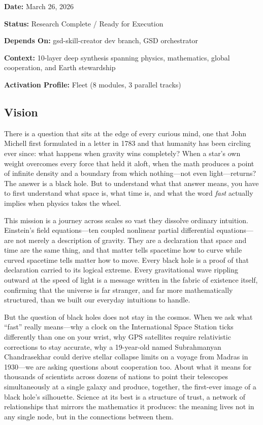 \documentclass[11pt,letterpaper]{article}
\newcommand{\metafield}[2]{\textbf{\sffamily #1} #2\par}
\begin{document}
\metafield{Date:}{March 26, 2026}
\metafield{Status:}{Research Complete / Ready for Execution}
\metafield{Depends On:}{gsd-skill-creator dev branch, GSD orchestrator}
\metafield{Context:}{10-layer deep synthesis spanning physics, mathematics, global cooperation, and Earth stewardship}
\metafield{Activation Profile:}{Fleet (8 modules, 3 parallel tracks)}

\subsection{Vision}

There is a question that sits at the edge of every curious mind, one that John Michell first formulated in a letter in 1783 and that humanity has been circling ever since: what happens when gravity wins completely? When a star's own weight overcomes every force that held it aloft, when the math produces a point of infinite density and a boundary from which nothing---not even light---returns? The answer is a black hole. But to understand what that answer means, you have to first understand what space is, what time is, and what the word \textit{fast} actually implies when physics takes the wheel.

This mission is a journey across scales so vast they dissolve ordinary intuition. Einstein's field equations---ten coupled nonlinear partial differential equations---are not merely a description of gravity. They are a declaration that space and time are the same thing, and that matter tells spacetime how to curve while curved spacetime tells matter how to move. Every black hole is a proof of that declaration carried to its logical extreme. Every gravitational wave rippling outward at the speed of light is a message written in the fabric of existence itself, confirming that the universe is far stranger, and far more mathematically structured, than we built our everyday intuitions to handle.

But the question of black holes does not stay in the cosmos. When we ask what ``fast'' really means---why a clock on the International Space Station ticks differently than one on your wrist, why GPS satellites require relativistic corrections to stay accurate, why a 19-year-old named Subrahmanyan Chandrasekhar could derive stellar collapse limits on a voyage from Madras in 1930---we are asking questions about cooperation too. About what it means for thousands of scientists across dozens of nations to point their telescopes simultaneously at a single galaxy and produce, together, the first-ever image of a black hole's silhouette. Science at its best is a structure of trust, a network of relationships that mirrors the mathematics it produces: the meaning lives not in any single node, but in the connections between them.
\end{document}
